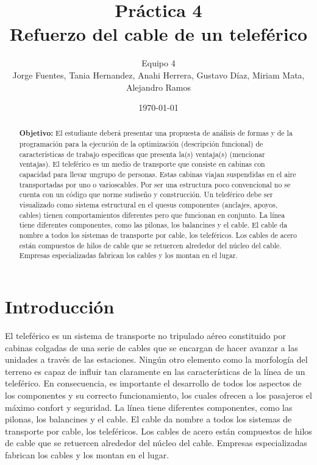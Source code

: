 \documentclass{article}
\author{Equipo 4 \\Jorge  Fuentes, Tania  Hernandez,
 Anahi Herrera, Gustavo  Díaz, Miriam  Mata, Alejandro Ramos} %
\title{Práctica 4 \\ Refuerzo del cable de un teleférico} %
\date{\today}
\begin{document}
\maketitle %
\begin{abstract} %
\textbf{Objetivo:} El estudiante deberá presentar una propuesta de análisis de formas y de la programación para la ejecución de la optimización (descripción funcional) de características de trabajo especificas que presenta la(s) ventaja(s) (mencionar ventajas). El teleférico es un medio de transporte que consiste en cabinas con capacidad para llevar ungrupo de personas. Estas cabinas viajan suspendidas en el aire transportadas por uno o varioscables. Por ser una estructura poco convencional no se cuenta con un código que norme sudiseño y construcción. Un teleférico debe ser visualizado como sistema estructural en el quesus componentes (anclajes, apoyos, cables) tienen comportamientos diferentes pero que funcionan en conjunto. La línea tiene diferentes componentes, como las pilonas, los balancines y el cable. El cable da nombre a todos los sistemas de transporte por cable, los teleféricos. Los cables de acero están compuestos de hilos de cable que se retuercen alrededor del núcleo del cable. Empresas especializadas fabrican los cables y los montan en el lugar.
\end{abstract}
\newpage
\tableofcontents
\newpage
\section{Introducción}\label{intro} %
El teleférico es un sistema de transporte no tripulado aéreo constituido por cabinas colgadas de una serie de cables que se encargan de hacer avanzar a las unidades a través de las estaciones. Ningún otro elemento como la morfología del terreno es capaz de influir tan claramente en las características de la línea de un teleférico. En consecuencia, es importante el desarrollo de todos los aspectos de los componentes y su correcto funcionamiento, los cuales ofrecen a los pasajeros el máximo confort y seguridad. La línea tiene diferentes componentes, como las pilonas, los balancines y el cable. El cable da nombre a todos los sistemas de transporte por cable, los teleféricos. Los cables de acero están compuestos de hilos de cable que se retuercen alrededor del núcleo del cable. Empresas especializadas fabrican los cables y los montan en el lugar.

\end{document}
